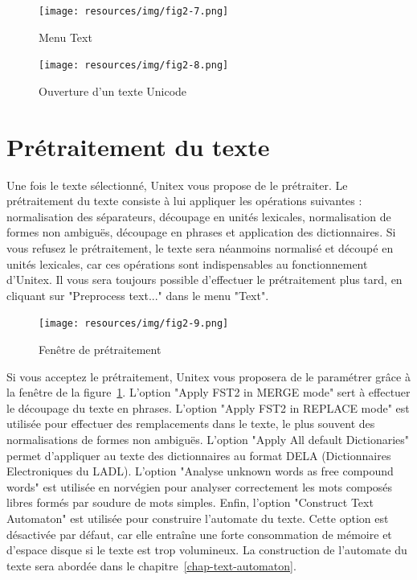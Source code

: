 \begin{figure}[!ht]
\begin{center}
\texttt{[image: resources/img/fig2-7.png]}
\caption{Menu Text}
\end{center}
\end{figure}

\begin{figure}[!ht]
\begin{center}
\texttt{[image: resources/img/fig2-8.png]}
\caption{Ouverture d’un texte Unicode}
\end{center}
\end{figure}



\section{Prétraitement du texte}
\noindent Une fois le texte sélectionné, Unitex vous propose de le prétraiter. Le prétraitement du
texte consiste à lui appliquer les opérations suivantes : normalisation des séparateurs, 
découpage en unités lexicales, normalisation de formes non ambiguës, découpage en phrases
et application des dictionnaires. Si vous refusez le prétraitement, le texte sera néanmoins
normalisé et découpé en unités lexicales, car ces opérations sont indispensables au
fonctionnement d’Unitex. Il vous sera toujours possible d’effectuer le prétraitement plus tard,
en cliquant sur "Preprocess text..." dans le menu "Text".


\begin{figure}[!ht]
\begin{center}
\texttt{[image: resources/img/fig2-9.png]}
\caption{Fenêtre de prétraitement\label{fig-preprocessing-frame}}
\end{center}
\end{figure}

\bigskip
\noindent 
Si vous acceptez le prétraitement, Unitex vous proposera de le paramétrer grâce à la fenêtre de la
figure~\ref{fig-preprocessing-frame}. L’option "Apply FST2 in MERGE mode" sert à effectuer le
découpage du texte en phrases. L’option "Apply FST2 in REPLACE mode" est utilisée pour effectuer des
remplacements dans le texte, le plus souvent des normalisations de formes non ambiguës. L’option
"Apply All default Dictionaries" permet d’appliquer au texte des dictionnaires au format DELA
(Dictionnaires Electroniques du LADL).  L’option "Analyse unknown words as free 
compound words" est utilisée en norvégien pour analyser correctement les mots composés libres
formés par soudure de mots simples. Enfin, l’option "Construct Text Automaton" est utilisée
pour construire l’automate du texte. Cette option est désactivée par défaut, car elle entraîne
une forte consommation de mémoire et d’espace disque si le texte est trop volumineux. La
construction de l’automate du texte sera abordée dans le chapitre~\ref{chap-text-automaton}.

